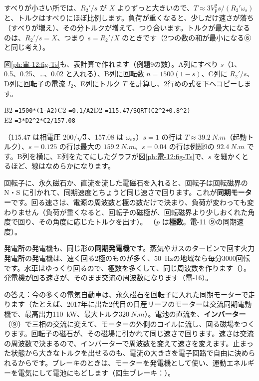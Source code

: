 \noindent すべりが小さい所では、$R_2'/s$ が $X$ よりずっと大きいので、$T\approx3V_{\mathrm p}^2s/(R_2'\omega_{\mathrm s})$ と、トルクはすべりにほぼ比例します。負荷が重くなると、少しだけ速さが落ち（すべりが増え）、その分トルクが増えて、つり合います。トルクが最大になるのは、$R_2'/s=X$、つまり $s=R_2'/X$ のときです（2つの数の和が最小になる⑥と同じ考え）。

図\ref{ph:電-12:fig-Ts}も、表計算で作れます（例題9の数）。A列にすべり $s$（1、0.5、0.25、…、0.02 と入れる）、B列に回転数 $n=1500(1-s)$、C列に $R_2'/s$、D列に回転子の電流 $I_2$、E列にトルク $T$ を計算し、2行めの式を下へコピーします。
\begin{bkcenter}\small
B2 \texttt{=1500*(1-A2)}\qquad C2 \texttt{=0.1/A2}\qquad D2 \texttt{=115.47/SQRT(C2\^{}2+0.8\^{}2)}\\
E2 \texttt{=3*D2\^{}2*C2/157.08}
\end{bkcenter}
\noindent （115.47 は相電圧 $200/\sqrt3$、157.08 は $\omega_{\mathrm s}$。）$s=1$ の行は $T\approx\qty{39.2}{N.m}$（起動トルク）、$s=0.125$ の行は最大の $\qty{159.2}{N.m}$、$s=0.04$ の行は例題9の $\qty{92.4}{N.m}$ です。B列を横に、E列をたてにしたグラフが図\ref{ph:電-12:fig-Ts}で、$s$ を細かくとるほど、線はなめらかになります。

\label{ph:電-12:sec8}
回転子に、永久磁石か、直流を流した電磁石を入れると、回転子は回転磁界の N・S に引かれて、同期速度とちょうど同じ速さで回ります。これが\textbf{同期モーター}です。回る速さは、電源の周波数と極の数だけで決まり、負荷が変わっても変わりません（負荷が重くなると、回転子の磁極が、回転磁界より少しおくれた角度で回り、その角度に応じたトルクを出す）。
（$p$ は\textbf{極数}。電-11 ⑨の同期速度）。

発電所の発電機も、同じ形の\textbf{同期発電機}です。蒸気やガスのタービンで回す火力発電所の発電機は、速く回る2極のものが多く、\qty{50}{Hz}の地域なら毎分3000回転です。水車はゆっくり回るので、極数を多くして、同じ周波数を作ります（）。発電機が回る速さが、そのまま交流の周波数になります（電-16）。

\bkhatenaref の答え：今の多くの電気自動車は、永久磁石を回転子に入れた同期モーターで走ります（たとえば、2017年に出た2代目の日産リーフのモーターは交流同期電動機で、最高出力\qty{110}{kW}、最大トルク$\qty{320}{N.m}$）。電池の直流を、\textbf{インバーター}（⑨）で三相の交流に変えて、モーターの外側のコイルに流し、回る磁場をつくります。回転子の磁石が、その磁場に引かれて同じ速さで回ります。速さは交流の周波数で決まるので、インバーターで周波数を変えて速さを変えます。止まった状態から大きなトルクを出せるのも、電流の大きさを電子回路で自由に決められるからです。ブレーキのときは、モーターを発電機として使い、運動エネルギーを電気にして電池にもどします（回生ブレーキ：）。

